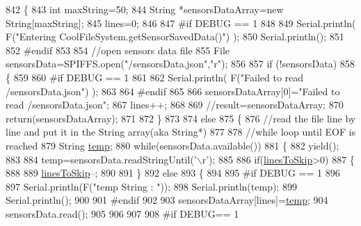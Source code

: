 \begin{DoxyCode}
842 \{
843     \textcolor{keywordtype}{int} maxString=50;
844     String *sensorsDataArray=\textcolor{keyword}{new} String[maxString];
845     lines=0;
846 
847 \textcolor{preprocessor}{#if DEBUG == 1 }
848 
849     Serial.println( F(\textcolor{stringliteral}{"Entering CoolFileSystem.getSensorSavedData()"}) );
850     Serial.println();
851 
852 \textcolor{preprocessor}{#endif}
853 
854     \textcolor{comment}{//open sensors data file}
855     File sensorsData=SPIFFS.open(\textcolor{stringliteral}{"/sensorsData.json"},\textcolor{stringliteral}{"r"});
856     
857     \textcolor{keywordflow}{if} (!sensorsData)
858     \{
859 
860 \textcolor{preprocessor}{    #if DEBUG == 1 }
861 
862         Serial.println( F(\textcolor{stringliteral}{"Failed to read /sensorsData.json"}) );
863 
864 \textcolor{preprocessor}{    #endif}
865          
866         sensorsDataArray[0]=\textcolor{stringliteral}{"Failed to read /sensorsData.json"};
867         lines++;
868 
869         \textcolor{comment}{//result=sensorsDataArray;}
870         \textcolor{keywordflow}{return}(sensorsDataArray);
871 
872     \}
873 
874     \textcolor{keywordflow}{else}
875     \{
876         \textcolor{comment}{//read the file line by line and put it in the String array(aka String*)        }
877 
878         \textcolor{comment}{//while loop until EOF is reached}
879         String \hyperlink{_irene3000_8h_a5905d48604152cf57aa6bfa087b49173}{temp};
880         \textcolor{keywordflow}{while}(sensorsData.available())
881         \{
882             yield();
883             
884             temp=sensorsData.readStringUntil(\textcolor{charliteral}{'\(\backslash\)r'});
885 
886             \textcolor{keywordflow}{if}(\hyperlink{class_cool_file_system_a84fdb6057e534b395512463daa28ea3c}{linesToSkip}>0)
887             \{
888 
889                 \hyperlink{class_cool_file_system_a84fdb6057e534b395512463daa28ea3c}{linesToSkip}--;
890         
891             \}
892             \textcolor{keywordflow}{else}
893             \{
894 
895 \textcolor{preprocessor}{            #if DEBUG == 1}
896 
897                 Serial.println(F(\textcolor{stringliteral}{"temp String : "}));
898                 Serial.println(temp);
899                 Serial.println();
900             
901 \textcolor{preprocessor}{            #endif}
902             
903                 sensorsDataArray[lines]=\hyperlink{_irene3000_8h_a5905d48604152cf57aa6bfa087b49173}{temp};
904                 sensorsData.read();
905             
906             
907         
908 \textcolor{preprocessor}{            #if DEBUG== 1}

\end{DoxyCode}
